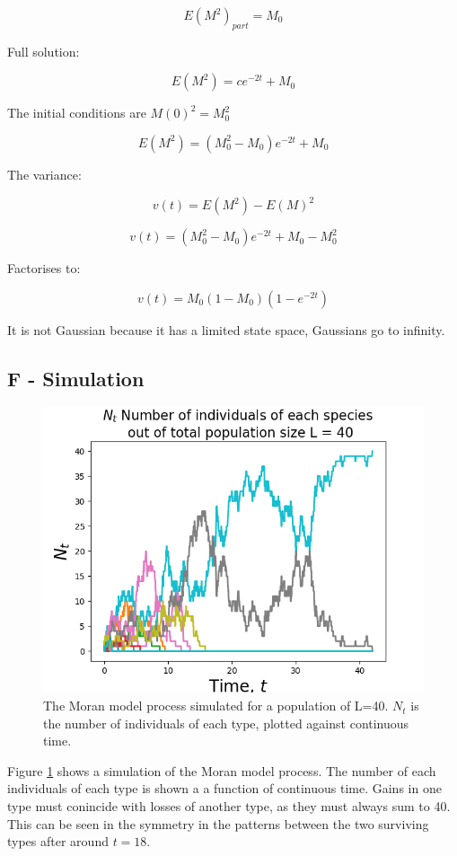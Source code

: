 \documentclass{article}
\begin{document}
$$E(M^2)_{part} = M_0$$

Full solution:

$$E(M^2) = c e^{-2t} + M_0$$

The initial conditions are $M(0)^2 = M_0^2$ 

$$E(M^2) = (M_0^2 -M_0)e^{-2t} + M_0$$

The variance:

$$v(t) = E(M^2) - E(M)^2$$

$$v(t) = (M_0^2 -M_0)e^{-2t} + M_0 - M_0^2$$

Factorises to:

$$v(t) = M_0(1-M_0)(1-e^{-2t})$$

It is not Gaussian because it has a limited state space, Gaussians go to infinity.

\subsection{F - Simulation}

\begin{figure}[H]
\includegraphics[scale=0.8]{moran_a.png} 
\caption{The Moran model process simulated for a population of L=40. $N_t$ is the number of individuals of each type, plotted against continuous time.} 
\label{fig:moran}
\end{figure}

Figure \ref{fig:moran} shows a simulation of the Moran model process. The number of each individuals of each type is shown a a function of continuous time. Gains in one type must conincide with losses of another type, as they must always sum to 40. This can be seen in the symmetry in the patterns between the two surviving types after around $t=18$.
\end{document}
